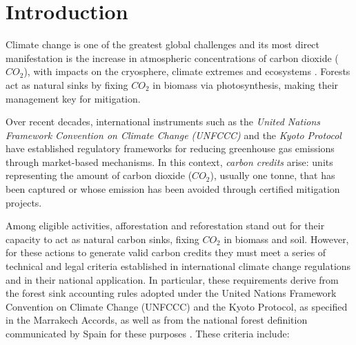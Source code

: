 \section{Introduction}

Climate change is one of the greatest global challenges and its most direct manifestation is the increase in atmospheric concentrations of carbon dioxide (\(CO_2\)), with impacts on the cryosphere, climate extremes and ecosystems \cite{IPCC2007}. Forests act as natural sinks by fixing \(CO_2\) in biomass via photosynthesis, making their management key for mitigation.


Over recent decades, international instruments such as the \textit{United Nations Framework Convention on Climate Change (UNFCCC)} and the \textit{Kyoto Protocol} \cite{UNFCCC1997,UNFCCC2015} have established regulatory frameworks for reducing greenhouse gas emissions through market-based mechanisms. In this context, \emph{carbon credits} arise: units representing the amount of carbon dioxide (\(CO_2\)), usually one tonne, that has been captured or whose emission has been avoided through certified mitigation projects.


Among eligible activities, afforestation and reforestation stand out for their capacity to act as natural carbon sinks, fixing \(CO_2\) in biomass and soil. However, for these actions to generate valid carbon credits they must meet a series of technical and legal criteria established in international climate change regulations and in their national application. In particular, these requirements derive from the forest sink accounting rules adopted under the United Nations Framework Convention on Climate Change (UNFCCC) and the Kyoto Protocol, as specified in the Marrakech Accords, as well as from the national forest definition communicated by Spain for these purposes \cite{UNFCCCMarrakech,UNFCCCSpainReview}. These criteria include:

